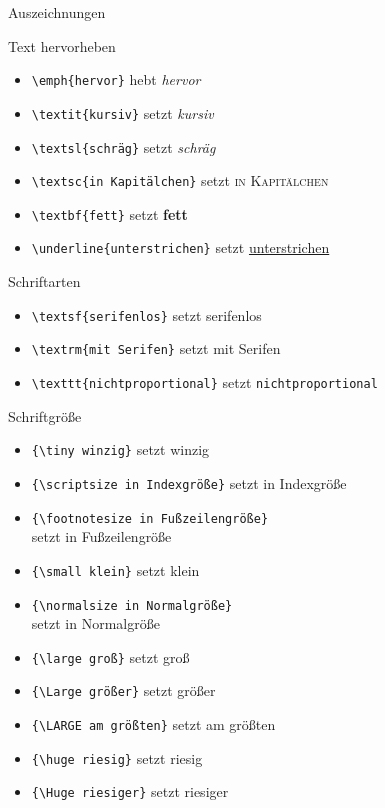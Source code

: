 \begin{Frame}[fragile]{Auszeichnungen}
  \begin{Block}{Text hervorheben}
    \begin{itemize}
      \item \lstinline-\emph{hervor}- hebt \emph{hervor}
      \item \lstinline-\textit{kursiv}- setzt \textit{kursiv}
      \item \lstinline-\textsl{schräg}- setzt \textsl{schräg}
      \item \lstinline-\textsc{in Kapitälchen}- setzt \textsc{in Kapitälchen}
      \item \lstinline-\textbf{fett}- setzt \textbf{fett}
      \item \lstinline-\underline{unterstrichen}- setzt \underline{unterstrichen}
    \end{itemize}
  \end{Block}
  
  \begin{Block}{Schriftarten}
    \begin{itemize}
      \item \lstinline-\textsf{serifenlos}- setzt \textsf{serifenlos}
      \item \lstinline-\textrm{mit Serifen}- setzt \textrm{mit Serifen}
      \item \lstinline-\texttt{nichtproportional}- setzt \texttt{nichtproportional}
    \end{itemize}
  \end{Block}
\end{Frame}

\begin{Frame}[fragile]{Schriftgröße}
  \begin{itemize}
    \item \lstinline-{\tiny winzig}- setzt {\tiny winzig}
    \item \lstinline-{\scriptsize in Indexgröße}- setzt {\scriptsize in Indexgröße}
    \item \lstinline-{\footnotesize in Fußzeilengröße}-\\ setzt {\footnotesize in Fußzeilengröße}
    \item \lstinline-{\small klein}- setzt {\small klein}
    \item \lstinline-{\normalsize in Normalgröße}-\\ setzt {\normalsize in Normalgröße}
    \item \lstinline-{\large groß}- setzt {\large groß}
    \item \lstinline-{\Large größer}- setzt {\Large größer}
    \item \lstinline-{\LARGE am größten}- setzt {\LARGE am größten}
    \item \lstinline-{\huge riesig}- setzt {\huge riesig}
    \item \lstinline-{\Huge riesiger}- setzt {\Huge riesiger}
  \end{itemize}
\end{Frame}

